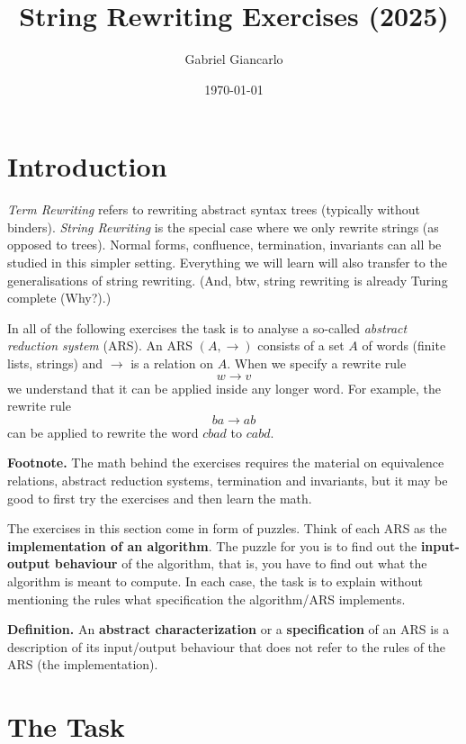 \documentclass[12pt]{article}
\title{String Rewriting Exercises (2025)}
\author{Gabriel Giancarlo}
\date{\today}
\begin{document}
\maketitle

\section*{Introduction}

\textit{Term Rewriting} refers to rewriting abstract syntax trees (typically without binders). 
\textit{String Rewriting} is the special case where we only rewrite strings (as opposed to trees). 
Normal forms, confluence, termination, invariants can all be studied in this simpler setting. 
Everything we will learn will also transfer to the generalisations of string rewriting. 
(And, btw, string rewriting is already Turing complete (Why?).)

\bigskip

In all of the following exercises the task is to analyse a so-called \textit{abstract reduction system} (ARS). 
An ARS $(A,\to)$ consists of a set $A$ of words (finite lists, strings) and $\to$ is a relation on $A$. 
When we specify a rewrite rule
\[
w \to v
\]
we understand that it can be applied inside any longer word. 
For example, the rewrite rule
\[
ba \to ab
\]
can be applied to rewrite the word $cbad$ to $cabd$.

\bigskip

\noindent\textbf{Footnote.} 
The math behind the exercises requires the material on equivalence relations, abstract reduction systems, termination and invariants, but it may be good to first try the exercises and then learn the math.

\bigskip

The exercises in this section come in form of puzzles. 
Think of each ARS as the \textbf{implementation of an algorithm}. 
The puzzle for you is to find out the \textbf{input-output behaviour} of the algorithm, that is, you have to find out what the algorithm is meant to compute. 
In each case, the task is to explain without mentioning the rules what specification the algorithm/ARS implements.

\medskip

\textbf{Definition.} 
An \textbf{abstract characterization} or a \textbf{specification} of an ARS is a description of its input/output behaviour that does not refer to the rules of the ARS (the implementation). 

\section*{The Task}
\end{document}
